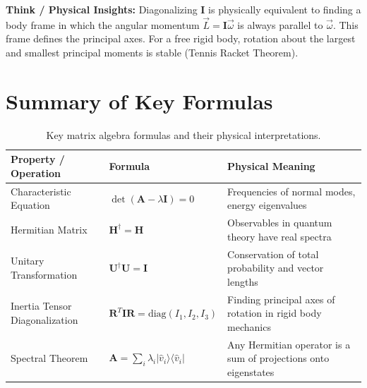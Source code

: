 \begin{psctexample}
\textbf{\color{rbruNavy}Think / Physical Insights:}
Diagonalizing $\mathbf{I}$ is physically equivalent to finding a body frame in which the angular momentum $\vec{L} = \mathbf{I}\vec{\omega}$ is always parallel to $\vec{\omega}$. This frame defines the principal axes. For a free rigid body, rotation about the largest and smallest principal moments is stable (Tennis Racket Theorem).
\qedexam
\end{psctexample}

\section{Summary of Key Formulas}
\begin{table}[H]
\centering
\small
\begin{tabularx}{\textwidth}{llX}
\toprule
\textbf{Property / Operation} & \textbf{Formula} & \textbf{Physical Meaning} \\
\midrule
Characteristic Equation & $\det(\mathbf{A} - \lambda\mathbf{I}) = 0$ & Frequencies of normal modes, energy eigenvalues \\
Hermitian Matrix & $\mathbf{H}^\dagger = \mathbf{H}$ & Observables in quantum theory have real spectra \\
Unitary Transformation & $\mathbf{U}^\dagger \mathbf{U} = \mathbf{I}$ & Conservation of total probability and vector lengths \\
Inertia Tensor Diagonalization & $\mathbf{R}^T \mathbf{I} \mathbf{R} = \text{diag}(I_1, I_2, I_3)$ & Finding principal axes of rotation in rigid body mechanics \\
Spectral Theorem & $\mathbf{A} = \sum_i \lambda_i |\hat{v}_i\rangle\langle\hat{v}_i|$ & Any Hermitian operator is a sum of projections onto eigenstates \\
\bottomrule
\end{tabularx}
\caption{Key matrix algebra formulas and their physical interpretations.}
\label{tab:ch05_summary}
\end{table}

